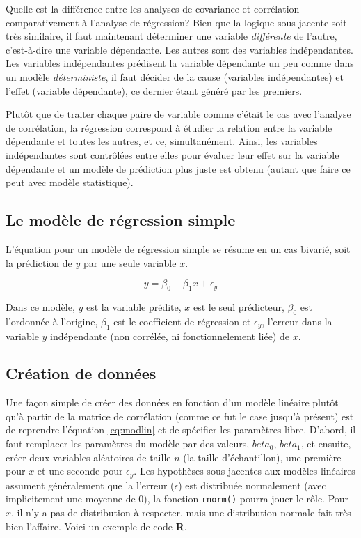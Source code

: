 \documentclass[
]{book}
\begin{document}
Quelle est la différence entre les analyses de covariance et corrélation comparativement à l'analyse de régression? Bien que la logique sous-jacente soit très similaire, il faut maintenant déterminer une variable \emph{différente} de l'autre, c'est-à-dire une variable dépendante. Les autres sont des variables indépendantes. Les variables indépendantes prédisent la variable dépendante un peu comme dans un modèle \emph{déterministe}, il faut décider de la cause (variables indépendantes) et l'effet (variable dépendante), ce dernier étant généré par les premiers.

Plutôt que de traiter chaque paire de variable comme c'était le cas avec l'analyse de corrélation, la régression correspond à étudier la relation entre la variable dépendante et toutes les autres, et ce, simultanément. Ainsi, les variables indépendantes sont contrôlées entre elles pour évaluer leur effet sur la variable dépendante et un modèle de prédiction plus juste est obtenu (autant que faire ce peut avec modèle statistique).

\hypertarget{le-moduxe8le-de-ruxe9gression-simple}{%
\subsection{Le modèle de régression simple}\label{le-moduxe8le-de-ruxe9gression-simple}}

L'équation pour un modèle de régression simple se résume en un cas bivarié, soit la prédiction de \(y\) par une seule variable \(x\).

\begin{equation}
y = \beta_0 + \beta_1 x + \epsilon_y
\label{eq:modlin}
\end{equation}

Dans ce modèle, \(y\) est la variable prédite, \(x\) est le seul prédicteur, \(\beta_0\) est l'ordonnée à l'origine, \(\beta_1\) est le coefficient de régression et \(\epsilon_y\), l'erreur dans la variable \(y\) indépendante (non corrélée, ni fonctionnelement liée) de \(x\).

\hypertarget{cruxe9ation-de-donnuxe9es-1}{%
\subsection{Création de données}\label{cruxe9ation-de-donnuxe9es-1}}

Une façon simple de créer des données en fonction d'un modèle linéaire plutôt qu'à partir de la matrice de corrélation (comme ce fut le case jusqu'à présent) est de reprendre l'équation \eqref{eq:modlin} et de spécifier les paramètres libre. D'abord, il faut remplacer les paramètres du modèle par des valeurs, \(beta_0\), \(beta_1\), et ensuite, créer deux variables aléatoires de taille \(n\) (la taille d'échantillon), une première pour \(x\) et une seconde pour \(\epsilon_y\). Les hypothèses sous-jacentes aux modèles linéaires assument généralement que la l'erreur (\(\epsilon\)) est distribuée normalement (avec implicitement une moyenne de 0), la fonction \texttt{rnorm()} pourra jouer le rôle. Pour \(x\), il n'y a pas de distribution à respecter, mais une distribution normale fait très bien l'affaire. Voici un exemple de code \textbf{R}.
\end{document}
